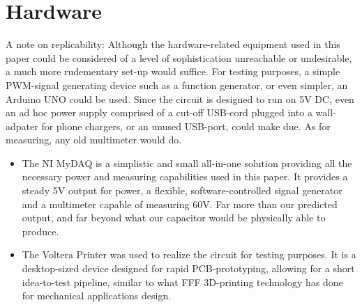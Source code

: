 \section{Hardware}
A note on replicability: Although the hardware-related equipment used in this paper could be considered of a level of sophistication unreachable or undesirable, a much more rudementary set-up would suffice. For testing purposes, a simple PWM-signal generating device such as a function generator, or even simpler, an Arduino UNO \cite{abhi} could be used. Since the circuit is designed to run on 5V DC, even an ad hoc power supply comprised of a cut-off USB-cord plugged into a wall-adpater for phone chargers, or an unused USB-port, could make due. As for measuring, any old multimeter would do.
\begin{itemize}
    \item The NI MyDAQ is a simplistic and small all-in-one solution providing all the necessary power and measuring capabilities used in this paper. It provides a steady 5V output for power, a flexible, software-controlled signal generator and a multimeter capable of measuring 60V\cite{mydaq}. Far more than our predicted output, and far beyond what our capacitor would be physically able to produce.
    \item The Voltera Printer was used to realize the circuit for testing purposes\cite{voltera}. It is a desktop-sized device designed for rapid PCB-prototyping, allowing for a short idea-to-test pipeline, similar to what FFF 3D-printing technology has done for mechanical applications design.
\end{itemize}

